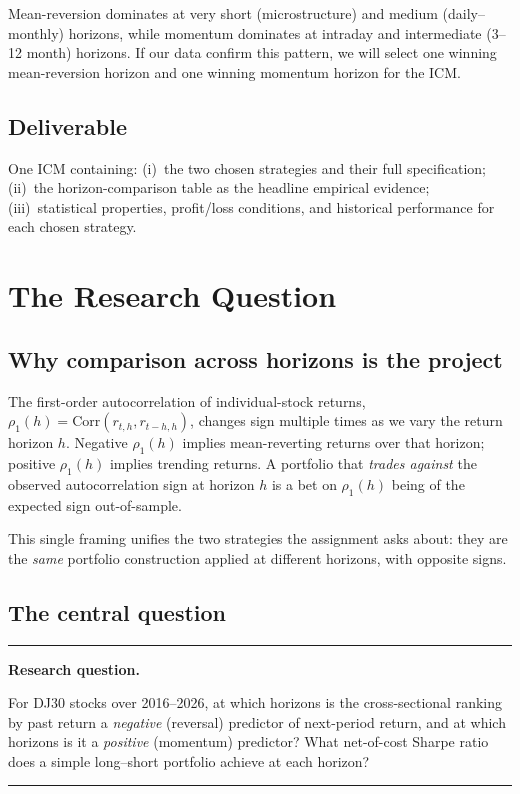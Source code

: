 \documentclass[11pt,letterpaper]{article}
\newenvironment{keybox}[1][Key Point]
  {\begin{center}\begin{minipage}{0.95\linewidth}\vspace{2pt}
   \rule{\linewidth}{0.5pt}\par\textbf{#1.}\par\vspace{-2pt}}
  {\par\rule{\linewidth}{0.5pt}\end{minipage}\end{center}}
\newcommand{\Corr}{\mathrm{Corr}}
\begin{document}
Mean-reversion dominates at very short (microstructure) and medium (daily--monthly) horizons, while momentum dominates at intraday and intermediate (3--12 month) horizons. If our data confirm this pattern, we will select one winning mean-reversion horizon and one winning momentum horizon for the ICM.

\subsection{Deliverable}

One ICM containing: (i)~the two chosen strategies and their full specification; (ii)~the horizon-comparison table as the headline empirical evidence; (iii)~statistical properties, profit/loss conditions, and historical performance for each chosen strategy.

\section{The Research Question}\label{sec:question}

\subsection{Why comparison across horizons is the project}

The first-order autocorrelation of individual-stock returns, $\rho_1(h) = \Corr(r_{t,h}, r_{t-h,h})$, changes sign multiple times as we vary the return horizon $h$. Negative $\rho_1(h)$ implies mean-reverting returns over that horizon; positive $\rho_1(h)$ implies trending returns. A portfolio that \emph{trades against} the observed autocorrelation sign at horizon $h$ is a bet on $\rho_1(h)$ being of the expected sign out-of-sample.

This single framing unifies the two strategies the assignment asks about: they are the \emph{same} portfolio construction applied at different horizons, with opposite signs.

\subsection{The central question}

\begin{keybox}[Research question]
For DJ30 stocks over 2016--2026, at which horizons is the cross-sectional ranking by past return a \emph{negative} (reversal) predictor of next-period return, and at which horizons is it a \emph{positive} (momentum) predictor? What net-of-cost Sharpe ratio does a simple long--short portfolio achieve at each horizon?
\end{keybox}
\end{document}
